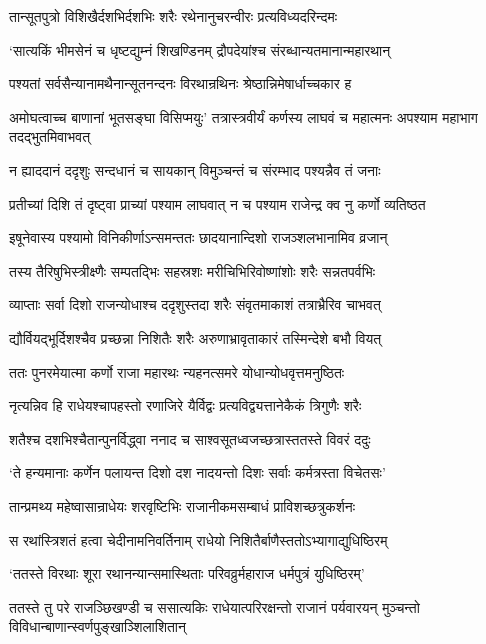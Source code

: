 \threelineshloka
{तान्सूतपुत्रो विशिखैर्दशभिर्दशभिः शरैः}
{रथेनानुचरन्वीरः प्रत्यविध्यदरिन्दमः}
{}


\twolineshloka
{`सात्यकिं भीमसेनं च धृष्टद्युम्नं शिखण्डिनम्}
{द्रौपदेयांश्च संरब्धान्यतमानान्महारथान्}


\twolineshloka
{पश्यतां सर्वसैन्यानामथैनान्सूतनन्दनः}
{विरथान्रथिनः श्रेष्ठान्निमेषार्धाच्चकार ह}


अमोघत्वाच्च बाणानां भूतसङ्घा विसिप्मयुः'
\twolineshloka
{तत्रास्त्रवीर्यं कर्णस्य लाघवं च महात्मनः}
{अपश्याम महाभाग तदद्भुतमिवाभवत्}


\twolineshloka
{न ह्याददानं ददृशुः सन्दधानं च सायकान्}
{विमुञ्चन्तं च संरम्भाद पश्यन्नैव तं जनाः}


\twolineshloka
{प्रतीच्यां दिशि तं दृष्ट्वा प्राच्यां पश्याम लाघवात्}
{न च पश्याम राजेन्द्र क्व नु कर्णो व्यतिष्ठत}


\twolineshloka
{इषूनेवास्य पश्यामो विनिकीर्णाऽन्समन्ततः}
{छादयानान्दिशो राजञ्शलभानामिव व्रजान्}


\twolineshloka
{तस्य तैरिषुभिस्त्रीक्ष्णैः सम्पतद्भिः सहस्रशः}
{मरीचिभिरिवोष्णांशोः शरैः सन्नतपर्वभिः}


\twolineshloka
{व्याप्ताः सर्वा दिशो राजन्योधाश्च ददृशुस्तदा}
{शरैः संवृतमाकाशं तत्राभ्रैरिव चाभवत्}


\twolineshloka
{द्यौर्वियद्भूर्दिशश्चैव प्रच्छन्ना निशितैः शरैः}
{अरुणाभ्रावृताकारं तस्मिन्देशे बभौ वियत्}


\twolineshloka
{ततः पुनरमेयात्मा कर्णो राजा महारथः}
{न्यहनत्समरे योधान्योधवृत्तमनुष्ठितः}


\twolineshloka
{नृत्यन्निव हि राधेयश्चापहस्तो रणाजिरे}
{यैर्विद्वः प्रत्यविद्व्यत्तानेकैकं त्रिगुणैः शरैः}


\twolineshloka
{शतैश्च दशभिश्चैतान्पुनर्विद्ध्वा ननाद च}
{साश्वसूतध्वजच्छत्रास्ततस्ते विवरं ददुः}


\twolineshloka
{`ते हन्यमानाः कर्णेन पलायन्त दिशो दश}
{नादयन्तो दिशः सर्वाः कर्मत्रस्ता विचेतसः'}


\twolineshloka
{तान्प्रमथ्य महेष्वासान्राधेयः शरवृष्टिभिः}
{राजानीकमसम्बाधं प्राविशच्छत्रुकर्शनः}


\twolineshloka
{स रथांस्त्रिशतं हत्वा चेदीनामनिवर्तिनाम्}
{राधेयो निशितैर्बाणैस्ततोऽभ्यागाद्युधिष्ठिरम्}


\twolineshloka
{`ततस्ते विरथाः शूरा रथानन्यान्समास्थिताः}
{परिवव्रुर्महाराज धर्मपुत्रं युधिष्ठिरम्'}


\threelineshloka
{ततस्ते तु परे राजञ्छिखण्डी च ससात्यकिः}
{राधेयात्परिरक्षन्तो राजानं पर्यवारयन्}
{मुञ्चन्तो विविधान्बाणान्स्वर्णपुङ्खाञ्शिलाशितान्}


